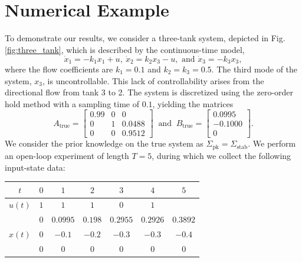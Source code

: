 \documentclass[9pt,shortpaper,twoside,web]{ieeecolor}
\begin{document}
\section{Numerical Example}
To demonstrate our results, we consider a three-tank system, depicted in Fig. \ref{fig:three_tank}, which is described by the continuous-time model,
\begin{equation}
\dot{x}_1= -k_1 x_1 + u, \ \dot{x}_2=k_{2}x_3-u, \text{ and } \dot{x}_3=-k_3x_3,
\end{equation}
where the flow coefficients are $k_{1}=0.1$ and \mbox{$k_{2}=k_3=0.5$}. The third mode of the system, $x_3$, is uncontrollable. This lack of controllability arises from the directional flow from tank 3 to 2.
The system is discretized using the zero-order hold method with a sampling time of $0.1$, yielding the matrices
\begin{equation}
A_{\text{true}} =
\begin{bmatrix}
0.99  &  0 &  0 \\
0 & 1 & 0.0488 \\
0 & 0 & 0.9512
\end{bmatrix}\ \text{ and }\
B_{\text{true}} =
\begin{bmatrix}
0.0995 \\
-0.1000 \\
0
\end{bmatrix}.
\end{equation}
We consider the prior knowledge on the true system as $\Sigma_\text{pk}=\Sigma_\text{stab}$. We perform an open-loop experiment of length $T=5$, during which we collect the following input-state data:\vspace{-0.25 cm}
\begin{table}[h]
    \centering
    \begin{tabular}{c|cccccc}
       $t$ & $0$ & $1$ & $2$ & $3$ & $4$ & $5$ \\ \hline
       $u(t)$ &  $1$ & $1$ & $1$ & $0$ & $1$ &  \\ \hline
        \multirow{3}{*}{$x(t)$} & $0$ & $0.0995$ & $0.198$ & $0.2955$ & $0.2926$ & $0.3892$ \\
        & $0$ &  $-0.1$ & $-0.2$ & $-0.3$ & $-0.3$ & $-0.4$ \\
        & $0$ & $0$ & $0$ & $0$ & $0$ & $0$ 
    \end{tabular}\vspace{-0.25 cm}
\end{table}
\end{document}

